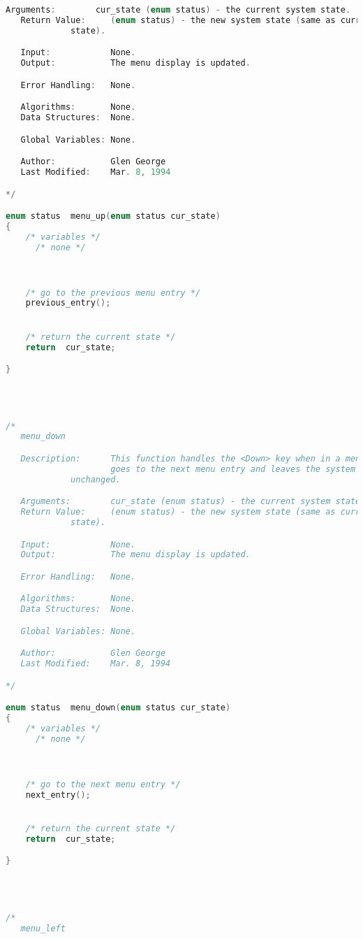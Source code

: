 \begin{lstlisting}[language=C]
   Arguments:        cur_state (enum status) - the current system state.
   Return Value:     (enum status) - the new system state (same as current
   		     state).

   Input:            None.
   Output:           The menu display is updated.

   Error Handling:   None.

   Algorithms:       None.
   Data Structures:  None.

   Global Variables: None.

   Author:           Glen George
   Last Modified:    Mar. 8, 1994

*/

enum status  menu_up(enum status cur_state)
{
    /* variables */
      /* none */



    /* go to the previous menu entry */
    previous_entry();


    /* return the current state */
    return  cur_state;

}




/*
   menu_down

   Description:      This function handles the <Down> key when in a menu.  It
                     goes to the next menu entry and leaves the system state
		     unchanged.

   Arguments:        cur_state (enum status) - the current system state.
   Return Value:     (enum status) - the new system state (same as current
   		     state).

   Input:            None.
   Output:           The menu display is updated.

   Error Handling:   None.

   Algorithms:       None.
   Data Structures:  None.

   Global Variables: None.

   Author:           Glen George
   Last Modified:    Mar. 8, 1994

*/

enum status  menu_down(enum status cur_state)
{
    /* variables */
      /* none */



    /* go to the next menu entry */
    next_entry();


    /* return the current state */
    return  cur_state;

}




/*
   menu_left


\end{lstlisting}

